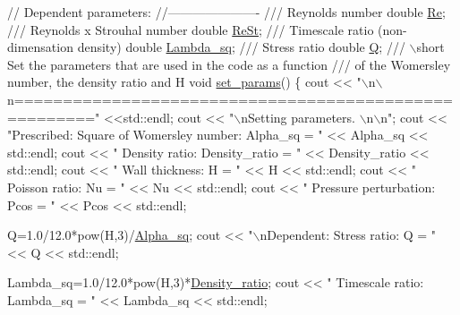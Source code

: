\begin{DoxyCodeInclude}
 \textcolor{comment}{// Dependent parameters:}
 \textcolor{comment}{//----------------------}
\textcolor{comment}{}
\textcolor{comment}{ /// Reynolds number}
\textcolor{comment}{} \textcolor{keywordtype}{double} \hyperlink{namespaceGlobal__Physical__Variables_ab814e627d2eb5bc50318879d19ab16b9}{Re};
\textcolor{comment}{}
\textcolor{comment}{ /// Reynolds x Strouhal number}
\textcolor{comment}{} \textcolor{keywordtype}{double} \hyperlink{namespaceGlobal__Physical__Variables_a085ee4bf968ffdd01a41b8c41864f907}{ReSt};
 \textcolor{comment}{}
\textcolor{comment}{ /// Timescale ratio (non-dimensation density)}
\textcolor{comment}{} \textcolor{keywordtype}{double} \hyperlink{namespaceGlobal__Physical__Variables_a6fe17557ceb32dd353827fba60408363}{Lambda\_sq};
\textcolor{comment}{}
\textcolor{comment}{ /// Stress ratio}
\textcolor{comment}{} \textcolor{keywordtype}{double} \hyperlink{namespaceGlobal__Physical__Variables_a66cb7ecda9ba0cd72367dd697f154545}{Q};
\textcolor{comment}{}
\textcolor{comment}{ /// \(\backslash\)short Set the parameters that are used in the code as a function}
\textcolor{comment}{ /// of the Womersley number, the density ratio and H}
\textcolor{comment}{} \textcolor{keywordtype}{void} \hyperlink{namespaceGlobal__Physical__Variables_a5928252d8e7440b329065c223926d4d2}{set\_params}()
 \{
  cout << \textcolor{stringliteral}{"\(\backslash\)n\(\backslash\)n======================================================"} <<std::endl;
  cout << \textcolor{stringliteral}{"\(\backslash\)nSetting parameters. \(\backslash\)n\(\backslash\)n"};
  cout << \textcolor{stringliteral}{"Prescribed: Square of Womersley number: Alpha\_sq = "} 
       << Alpha\_sq << std::endl;  
  cout << \textcolor{stringliteral}{"            Density ratio:         Density\_ratio = "} 
       << Density\_ratio << std::endl;
  cout << \textcolor{stringliteral}{"            Wall thickness:                    H = "} 
       << H << std::endl;
  cout << \textcolor{stringliteral}{"            Poisson ratio:                    Nu = "} 
       << Nu << std::endl;
  cout << \textcolor{stringliteral}{"            Pressure perturbation:          Pcos = "} 
       << Pcos << std::endl;


  Q=1.0/12.0*pow(H,3)/\hyperlink{namespaceGlobal__Physical__Variables_a056817f9a80034eff75fcf94c44b08cd}{Alpha\_sq};
  cout << \textcolor{stringliteral}{"\(\backslash\)nDependent:  Stress ratio:                      Q = "} 
       << Q << std::endl;

  Lambda\_sq=1.0/12.0*pow(H,3)*\hyperlink{namespaceGlobal__Physical__Variables_af5163137c5b98c6ebb942973cba4e297}{Density\_ratio};
  cout << \textcolor{stringliteral}{"            Timescale ratio:           Lambda\_sq = "} 
       << Lambda\_sq << std::endl;


\end{DoxyCodeInclude}
